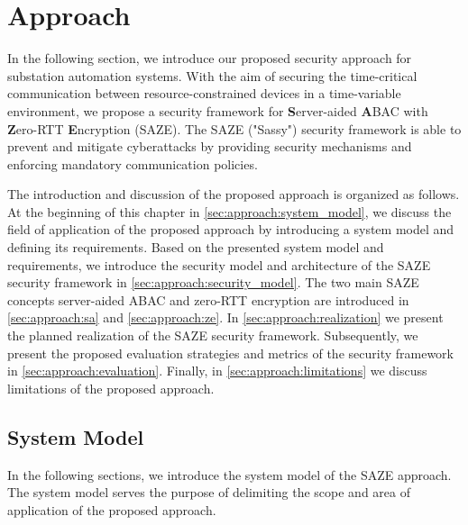 \chapter{Approach}
\label{ch:approach}
In the following section, we introduce our proposed security approach for substation automation systems.
With the aim of securing the time-critical communication between resource-constrained devices in a time-variable environment, we propose a security framework for \textbf{S}erver-aided \textbf{A}BAC with \textbf{Z}ero-RTT \textbf{E}ncryption (SAZE).
The SAZE ("Sassy") security framework is able to prevent and mitigate cyberattacks by providing security mechanisms and enforcing mandatory communication policies.

The introduction and discussion of the proposed approach is organized as follows.
At the beginning of this chapter in \autoref{sec:approach:system_model}, we discuss the field of application of the proposed approach by introducing a system model and defining its requirements.
Based on the presented system model and requirements, we introduce the security model and architecture of the SAZE security framework in \autoref{sec:approach:security_model}.
The two main SAZE concepts server-aided ABAC and zero-RTT encryption are introduced in \autoref{sec:approach:sa} and \autoref{sec:approach:ze}.
In \autoref{sec:approach:realization} we present the planned realization of the SAZE security framework.
Subsequently, we present the proposed evaluation strategies and metrics of the security framework in \autoref{sec:approach:evaluation}.
Finally, in \autoref{sec:approach:limitations} we discuss limitations of the proposed approach.

\section{System Model}
\label{sec:approach:system_model}
In the following sections, we introduce the system model of the SAZE approach.
The system model serves the purpose of delimiting the scope and area of application of the proposed approach.

